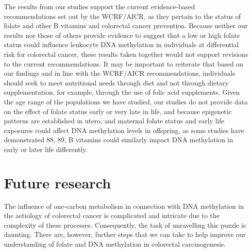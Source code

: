 \noindent The results from our studies support the current evidence-based recommendations set out by the WCRF/AICR, as they pertain to the status of folate and other B vitamins and colorectal cancer prevention. Because neither our results nor those of others provide evidence to suggest that a low or high folate status could influence leukocyte DNA methylation in individuals at differential risk for colorectal cancer, these results taken together would not support revisions to the current recommendations. It may be important to reiterate that based on our findings and in line with the WCRF/AICR recommendations, individuals should seek to meet nutritional needs through diet and not through dietary supplementation, for example, through the use of folic acid supplements. Given the age range of the populations we have studied, our studies do not provide data on the effect of folate status early or very late in life, and because epigenetic patterns are established in utero, and maternal folate status and early 
life exposures could affect DNA methylation levels in offspring, as some studies have demonstrated 88, 89, B vitamins could similarly impact DNA methylation in early or later life differently. 
 
\section{Future research} %
The influence of one-carbon metabolism in connection with DNA methylation in the aetiology of colorectal cancer is complicated and intricate due to the complexity of these processes. Consequently, the task of unravelling this puzzle is daunting. There are, however, further steps that we can take to help improve our understanding of folate and DNA methylation in colorectal carcinogenesis. 
 
